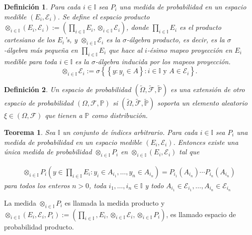 \documentclass{article}
\newtheorem{Def}{Definición}
\newtheorem{Teo}{Teorema}
\newcommand{\prob}{\mathbb{P}}
\begin{document}
\begin{Def}
Para cada $i\in \mathbb{I}$ sea $P_{i}$ una medida de probabilidad en un espacio medible $\left(E_{i},\mathcal{E}_{i}\right)$. Se define el espacio producto
$\otimes_{i\in\mathbb{I}}\left(E_{i},\mathcal{E}_{i}\right):=\left(\prod_{i\in\mathbb{I}}E_{i},\otimes_{i\in\mathbb{I}}\mathcal{E}_{i}\right)$, donde $\prod_{i\in\mathbb{I}}E_{i}$ es el producto cartesiano de los $E_{i}$'s, y $\otimes_{i\in\mathbb{I}}\mathcal{E}_{i}$ es la $\sigma$-\'algebra producto, es decir, es la $\sigma$-\'algebra m\'as peque\~na en $\prod_{i\in\mathbb{I}}E_{i}$ que hace al $i$-\'esimo mapeo proyecci\'on en $E_{i}$ medible para toda $i\in\mathbb{I}$ es la $\sigma$-\'algebra inducida por los mapeos proyecci\'on. $$\otimes_{i\in\mathbb{I}}\mathcal{E}_{i}:=\sigma\left\{\left\{y:y_{i}\in A\right\}:i\in\mathbb{I}\textrm{ y }A\in\mathcal{E}_{i}\right\}.$$
\end{Def}

\begin{Def}
Un espacio de probabilidad $\left(\tilde{\Omega},\tilde{\mathcal{F}},\tilde{\prob}\right)$ es una extensi\'on de otro espacio de probabilidad $\left(\Omega,\mathcal{F},\prob\right)$ si $\left(\tilde{\Omega},\tilde{\mathcal{F}},\tilde{\prob}\right)$ soporta un elemento aleatorio $\xi\in\left(\Omega,\mathcal{F}\right)$ que tienen a $\prob$ como distribuci\'on.
\end{Def}

\begin{Teo}
Sea $\mathbb{I}$ un conjunto de \'indices arbitrario. Para cada $i\in\mathbb{I}$ sea $P_{i}$ una medida de probabilidad en un espacio medible $\left(E_{i},\mathcal{E}_{i}\right)$. Entonces existe una \'unica medida de probabilidad $\otimes_{i\in\mathbb{I}}P_{i}$ en $\otimes_{i\in\mathbb{I}}\left(E_{i},\mathcal{E}_{i}\right)$ tal que 

\begin{eqnarray*}
\otimes_{i\in\mathbb{I}}P_{i}\left(y\in\prod_{i\in\mathbb{I}}E_{i}:y_{i}\in A_{i_{1}},\ldots,y_{n}\in A_{i_{n}}\right)=P_{i_{1}}\left(A_{i_{n}}\right)\cdots P_{i_{n}}\left(A_{i_{n}}\right)
\end{eqnarray*}
para todos los enteros $n>0$, toda $i_{1},\ldots,i_{n}\in\mathbb{I}$ y todo $A_{i_{1}}\in\mathcal{E}_{i_{1}},\ldots,A_{i_{n}}\in\mathcal{E}_{i_{n}}$
\end{Teo}

La medida $\otimes_{i\in\mathbb{I}}P_{i}$ es llamada la medida producto y $\otimes_{i\in\mathbb{I}}\left(E_{i},\mathcal{E}_{i},P_{i}\right):=\left(\prod_{i\in\mathbb{I}},E_{i},\otimes_{i\in\mathbb{I}}\mathcal{E}_{i},\otimes_{i\in\mathbb{I}}P_{i}\right)$, es llamado espacio de probabilidad producto.
\end{document}
